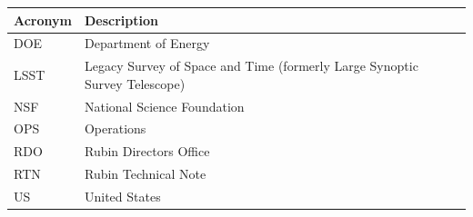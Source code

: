 \addtocounter{table}{-1}
\begin{longtable}{p{}p{}}\hline
\textbf{Acronym} & \textbf{Description}  \\\hline

DOE & Department of Energy \\\hline
LSST & Legacy Survey of Space and Time (formerly Large Synoptic Survey Telescope) \\\hline
NSF & National Science Foundation \\\hline
OPS & Operations \\\hline
RDO & Rubin Directors Office \\\hline
RTN & Rubin Technical Note \\\hline
US & United States \\\hline
\end{longtable}
